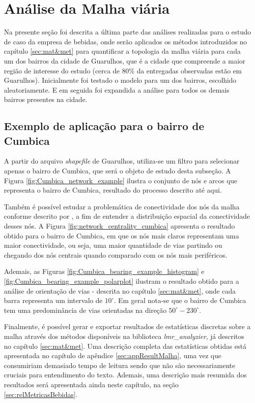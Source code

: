 \section{Análise da Malha viária} \label{sec:AMBEV_MalhaViaria}

Na presente seção foi descrita a última parte das análises realizadas para o estudo de caso da empresa de bebidas, onde serão aplicados os métodos introduzidos no capítulo \ref{sec:mat&met} para quantificar a topologia da malha viária para cada um dos bairros da cidade de Guarulhos, que é a cidade que compreende a maior região de interesse do estudo (cerca de 80\% da entregadas observadas estão em Guarulhos).
Inicialmente foi testado o modelo para um dos bairros, escolhido aleatoriamente. 
E em seguida foi expandida a análise para todos os demais bairros presentes na cidade.

\subsection{Exemplo de aplicação para o bairro de Cumbica}

A partir do arquivo \textit{shapefile} de Guarulhos, utiliza-se um filtro para selecionar apenas o bairro de Cumbica, que será o objeto de estudo desta subseção. 
%
A Figura \ref{fig:Cumbica_network_example} ilustra o conjunto de nós e arcos que representa o bairro de Cumbica, resultado do processo descrito até aqui.
%

Também é possível estudar a problemática de conectividade dos nós da malha conforme descrito por , a fim de entender a distribuição espacial da conectividade desses nós.
%
A Figura \ref{fig:network_centrality_cumbica} apresenta o resultado obtido para o bairro de Cumbica, em que os nós mais claros representam uma maior conectividade, ou seja, uma maior quantidade de vias partindo ou chegando dos nós centrais quando comparado com os nós mais periféricos. 

Ademais, as Figuras \ref{fig:Cumbica_bearing_example_histogram} e \ref{fig:Cumbica_bearing_example_polarplot} ilustram o resultado obtido para a análise de orientação de vias - descrita no capítulo \ref{sec:mat&met}, onde cada barra representa um intervalo de $10^{\circ}$.
Em geral nota-se que o bairro de Cumbica tem uma predominância de vias orientadas na direção $50^{\circ}-230^{\circ}$.

Finalmente, é possível gerar e exportar resultados de estatísticas discretas sobre a malha através dos métodos disponíveis na biblioteca \textit{lmr\_analyzier}, já descritos no capítulo \ref{sec:mat&met}.
%
Uma descrição completa das estatísticas obtidas está apresentada no capítulo de apêndice \ref{sec:appResultMalha}, uma vez que consumiriam demasiado tempo de leitura sendo que não são necessariamente cruciais para entendimento do texto. 
Ademais, uma descrição mais resumida dos resultados será apresentada ainda neste capítulo, na seção \ref{sec:relMetricasBebidas}.

